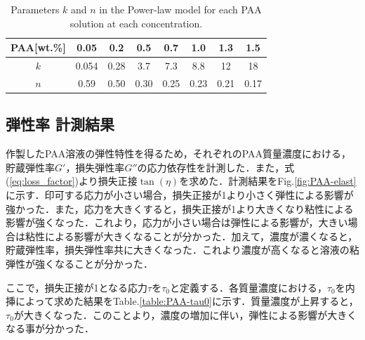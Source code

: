 \begin{table}[h]
	\centering
	\caption{Parameters $k$ and $n$ in the Power-law model for each PAA solution at each concentration.}
	\label{table:power-law}
	\begin{tabular}{c|c|c|c|c|c|c|c} \hline
		PAA[wt.\%] & 0.05  & 0.2  & 0.5  & 0.7  & 1.0  & 1.3  & 1.5  \\ \hline \hline
		$k$        & 0.054 & 0.28 & 3.7  & 7.3  & 8.8  & 12   & 18   \\ \hline
		$n$        & 0.59  & 0.50 & 0.30 & 0.25 & 0.23 & 0.21 & 0.17 \\ \hline
	\end{tabular}
\end{table}

\newpage

\subsection{弾性率 計測結果}
\label{sec:elasticity}

作製したPAA溶液の弾性特性を得るため，それぞれのPAA質量濃度における，貯蔵弾性率$G'$，損失弾性率$G''$の応力依存性を計測した．また，式(\ref{eq:loss_factor})より損失正接$\tan\left(\eta\right)$を求めた．計測結果をFig.\ref{fig:PAA-elast}に示す．印可する応力が小さい場合，損失正接が1より小さく弾性による影響が強かった．また，応力を大きくすると，損失正接が1より大きくなり粘性による影響が強くなった．これより，応力が小さい場合は弾性による影響が，大きい場合は粘性による影響が大きくなることが分かった．加えて，濃度が濃くなると，貯蔵弾性率，損失弾性率共に大きくなった．これより濃度が高くなると溶液の粘弾性が強くなることが分かった．

ここで，損失正接が1となる応力$\tau$を$\tau_0$と定義する．各質量濃度における，$\tau_0$を内挿によって求めた結果をTable.\ref{table:PAA-tau0}に示す．質量濃度が上昇すると，$\tau_0$が大きくなった．このことより，濃度の増加に伴い，弾性による影響が大きくなる事が分かった．

